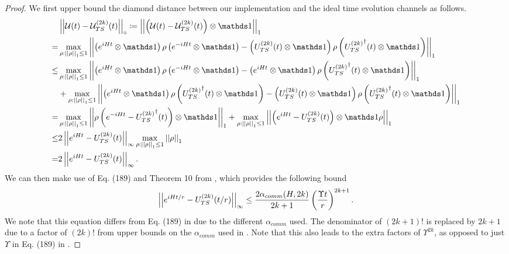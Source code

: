 \begin{proof}
    We first upper bound the diamond distance between our implementation and the ideal time evolution channels as follows.
    \begin{align}
        &\diamondnorm{\capU(t) - \curlyP{2k}(t)} \coloneqq \norm{\parens{\capU(t) - \curlyP{2k}(t)}\otimes \openone}_1 \label{eq:diamond_to_spectral_start} \\
        =& \max_{\rho : \norm{\rho}_1 \leq 1} \norm{\parens{e^{iHt}\otimes \openone} \rho \parens{e^{-i H t}\otimes \openone} - \parens{\trotterU{2k}(t)\otimes \openone} \rho \parens{\trotterU{2k}^\dagger(t)\otimes \openone} }_1 \\
        \leq& \max_{\rho : \norm{\rho}_1 \leq 1} \norm{\parens{e^{iHt}\otimes \openone} \rho \parens{e^{-i H t}\otimes \openone} - \parens{e^{i H t} \otimes \openone} \rho \parens{\trotterU{2k}^\dagger(t) \otimes \openone} }_1 \\
        ~& +\max_{\rho : \norm{\rho}_1 \leq 1} \norm{ \parens{e^{i H t} \otimes \openone} \rho \parens{\trotterU{2k}^\dagger(t) \otimes \openone}  - \parens{\trotterU{2k}(t)\otimes \openone} \rho \parens{\trotterU{2k}^\dagger(t)\otimes \openone} }_1 \nonumber \\
        =& \max_{\rho : \norm{\rho}_1 \leq 1} \norm{\rho \parens{e^{-i H t} - \trotterU{2k}^\dagger(t)}\otimes \openone}_1 + \max_{\rho : \norm{\rho}_1 \leq 1} \norm{\parens{e^{i H t} - \trotterU{2k}(t)}\otimes \openone \rho}_1 \\
        \leq & 2 \norm{e^{i H t} - \trotterU{2k}(t)}_\infty \max_{\rho : \norm{\rho}_1 \leq 1} \norm{\rho}_1 \\
        = & 2 \norm{e^{i H t} - \trotterU{2k}(t)}_\infty. \label{eq:TS_intermediate_1}
    \end{align}
    We can then make use of Eq. (189) and Theorem 10 from \cite{childs2021theory}, which provides the following bound
    \begin{equation}
        \left| \left| e^{iHt/r} - {U_{TS}^{( 2k )}}(t/r) \right| \right|_{\infty} \leq \frac{2 \alpha_{comm}(H, 2k)}{2k+1} \left( \frac{\Upsilon t}{r} \right)^{2k+1}. \label{eq:TS_intermediate_2}
    \end{equation}
    We note that this equation differs from Eq. (189) in \cite{childs2021theory} due to the different $\alpha_{comm}$ used. The denominator of $(2k+1)!$ is replaced by $2k+1$ due to a factor of $(2k)!$ from upper bounds on the $\alpha_{comm}$ used in \cite{childs2021theory}. Note that this also leads to the extra factors of $\Upsilon^{2k}$, as opposed to just $\Upsilon$ in Eq. (189) in \cite{childs2021theory}.
    

\end{proof}
